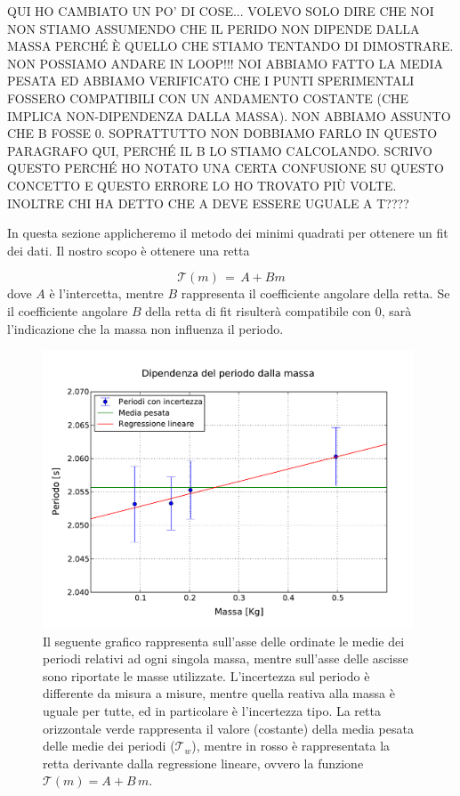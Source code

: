 QUI HO CAMBIATO UN PO' DI COSE... VOLEVO SOLO DIRE CHE NOI NON STIAMO ASSUMENDO CHE IL PERIDO 
NON DIPENDE DALLA MASSA PERCHÉ È QUELLO CHE STIAMO TENTANDO DI DIMOSTRARE. NON POSSIAMO ANDARE IN LOOP!!!
NOI ABBIAMO FATTO LA MEDIA PESATA ED ABBIAMO VERIFICATO CHE I PUNTI SPERIMENTALI FOSSERO
COMPATIBILI CON UN ANDAMENTO COSTANTE (CHE IMPLICA NON-DIPENDENZA DALLA MASSA). NON ABBIAMO ASSUNTO CHE
B FOSSE 0. SOPRATTUTTO NON DOBBIAMO FARLO IN QUESTO PARAGRAFO QUI, PERCHÉ IL B LO STIAMO CALCOLANDO.
SCRIVO QUESTO PERCHÉ HO NOTATO UNA CERTA CONFUSIONE SU QUESTO CONCETTO E QUESTO ERRORE LO HO TROVATO PIÙ VOLTE.
INOLTRE CHI HA DETTO CHE A DEVE ESSERE UGUALE A T????

In questa sezione applicheremo il metodo dei minimi quadrati per ottenere un fit dei dati.
Il nostro scopo è ottenere una retta

\begin{equation}
	\mathcal{T}(m) \,=\, A + B m 
\end{equation}
%
dove $A$ è l'intercetta, mentre $B$ rappresenta il coefficiente angolare della retta. Se il coefficiente angolare $B$ della 
retta di fit risulterà compatibile con 0, sarà l'indicazione che la massa non influenza il periodo. 

\begin{figure}
    \centering
    \includegraphics[width=110mm]{immagini/masse.pdf}
    \caption{Il seguente grafico rappresenta sull'asse delle ordinate le medie dei periodi relativi ad ogni
        singola massa, mentre sull'asse delle ascisse sono riportate le masse utilizzate. L'incertezza sul periodo
        è differente da misura a misure, mentre quella reativa alla massa è uguale per tutte, ed in particolare è
        l'incertezza tipo. La retta orizzontale verde rappresenta il valore (costante) della media pesata delle medie
        dei periodi ($\mathcal{T}_w$), mentre in rosso è rappresentata la retta derivante dalla regressione lineare,
        ovvero la funzione $\mathcal{T}(m) = A + B\,m$.}
    \label{fig:masse_periodi}
\end{figure}


